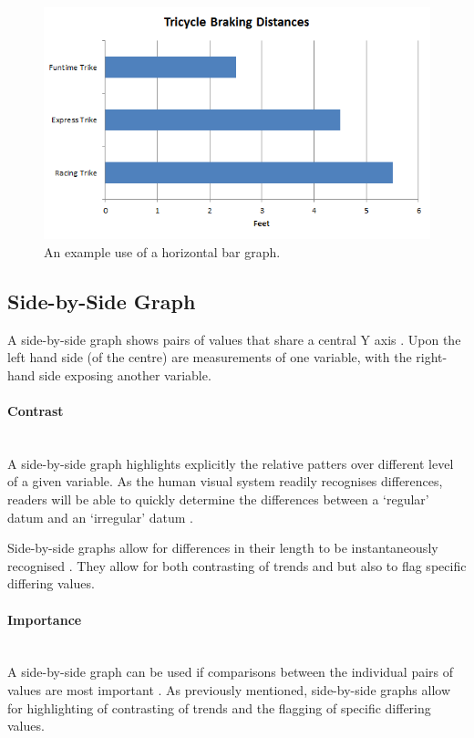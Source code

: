 \begin{figure}[H]
  \centering
    \includegraphics[scale=1]{chapter3/visualisation/line_bar_hori.png}
  \caption{An example use of a horizontal bar graph.}
  \label{fig:line_bar_hori}
\end{figure}


\subsection{Side-by-Side Graph}
A side-by-side graph shows pairs of values that share a central Y axis 
\citep{kosslyn06}. Upon the left hand side (of the centre) are measurements of
one variable, with the right-hand side exposing another variable.

\paragraph{Contrast} ~\\
A side-by-side graph highlights explicitly the relative patters over different 
level of a given variable. As the human visual system readily recognises 
differences, readers will be able to quickly determine the differences between 
a `regular' datum and an `irregular' datum \citep{kosslyn06}.

Side-by-side graphs allow for differences in their length to be instantaneously
recognised \citep{kosslyn06}. They allow for both contrasting of trends and but
also to flag specific differing values.

\paragraph{Importance} ~\\
A side-by-side graph can be used if comparisons between the individual pairs of 
values are most important \citep{kosslyn06}. As previously mentioned, 
side-by-side graphs allow for highlighting of contrasting of trends and the 
flagging of specific differing values.

